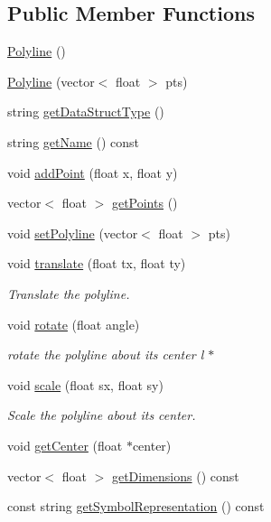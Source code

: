 \subsection*{Public Member Functions}
\begin{DoxyCompactItemize}
\item 
\hyperlink{classbridges_1_1datastructure_1_1_polyline_a488f6612485fc66534035c3574281a11}{Polyline} ()
\item 
\hyperlink{classbridges_1_1datastructure_1_1_polyline_aceb69c3294ab4c16b2931e1073d3f996}{Polyline} (vector$<$ float $>$ pts)
\item 
string \hyperlink{classbridges_1_1datastructure_1_1_polyline_a49b37ad55cf64fe759ee5a0f46e2e0cc}{get\+Data\+Struct\+Type} ()
\item 
string \hyperlink{classbridges_1_1datastructure_1_1_polyline_a46f2830cd85a09e9c4d62d54110dbe13}{get\+Name} () const
\item 
void \hyperlink{classbridges_1_1datastructure_1_1_polyline_a00698223911f07cafca29ec80c507678}{add\+Point} (float x, float y)
\item 
vector$<$ float $>$ \hyperlink{classbridges_1_1datastructure_1_1_polyline_a634034b6874af45e2b8c56d70e8725c5}{get\+Points} ()
\item 
void \hyperlink{classbridges_1_1datastructure_1_1_polyline_ab1fb850dabd3ed58fd4f916992a0b9a6}{set\+Polyline} (vector$<$ float $>$ pts)
\item 
void \hyperlink{classbridges_1_1datastructure_1_1_polyline_a0b651b1c383b228f8d473232e64e4bda}{translate} (float tx, float ty)
\begin{DoxyCompactList}\small\item\em Translate the polyline. \end{DoxyCompactList}\item 
void \hyperlink{classbridges_1_1datastructure_1_1_polyline_aa61978ccbb0b086dc8f55e90ccca23c9}{rotate} (float angle)
\begin{DoxyCompactList}\small\item\em rotate the polyline about its center l $\ast$ \end{DoxyCompactList}\item 
void \hyperlink{classbridges_1_1datastructure_1_1_polyline_adf06f484d9a48960de84ed3646903f3a}{scale} (float sx, float sy)
\begin{DoxyCompactList}\small\item\em Scale the polyline about its center. \end{DoxyCompactList}\item 
void \hyperlink{classbridges_1_1datastructure_1_1_polyline_ad0783deb77873eda19528681bbbca25c}{get\+Center} (float $\ast$center)
\item 
vector$<$ float $>$ \hyperlink{classbridges_1_1datastructure_1_1_polyline_aefa5c986d003c9bde234e230a6bd8bd8}{get\+Dimensions} () const
\item 
const string \hyperlink{classbridges_1_1datastructure_1_1_polyline_a176c06400a3b105fa651c69891381201}{get\+Symbol\+Representation} () const
\end{DoxyCompactItemize}
